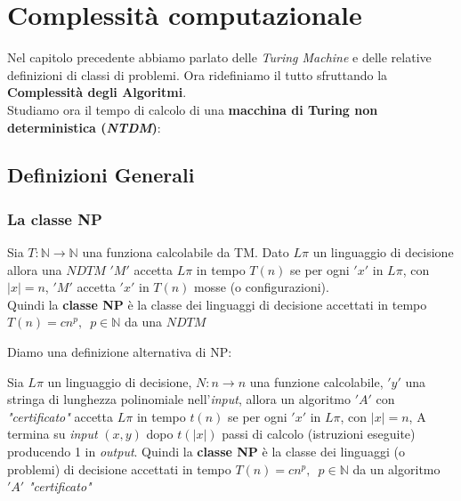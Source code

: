 \chapter{Complessità computazionale}
Nel capitolo precedente abbiamo parlato delle \textit{Turing Machine} e delle relative definizioni di classi di problemi. Ora ridefiniamo il tutto sfruttando la \textbf{Complessità degli Algoritmi}.\\
Studiamo ora il tempo di calcolo di una \textbf{macchina di Turing non
	deterministica (\textit{NTDM})}:
\section{Definizioni Generali}
\subsection{La classe NP}
\begin{definizione}
	Sia $T:\mathbb{N}\to\mathbb{N}$ una funziona calcolabile da TM. Dato $L\pi$ un
	linguaggio di decisione allora una $NDTM$ $ 'M' $ accetta $L\pi$ in tempo
	$T(n)$ se per ogni $ 'x' $ in $L\pi$, con $|x|=n$,  $ 'M' $ accetta $ 'x' $ in $T(n)$
	mosse (o configurazioni).\\
	Quindi la \textbf{classe NP} è la classe dei linguaggi di decisione accettati
	in tempo $T(n)=cn^p,\,\,\,p\in \mathbb{N}$ da una $NDTM$
\end{definizione}
Diamo una definizione alternativa di NP:
\begin{definizione}
	Sia $L\pi$ un linguaggio di decisione, $N:n\to n$ una funzione calcolabile,
	$ 'y' $ una stringa di lunghezza polinomiale nell'\textit{input}, allora un algoritmo $ 'A' $
	con \textit{"certificato"} accetta $L\pi$ in tempo $t(n)$ se per ogni $ 'x' $ in $L\pi$,
	con $|x|=n$, A termina su \textit{input} $(x,y)$ dopo $t(|x|)$ passi di calcolo
	(istruzioni eseguite) producendo 1 in \textit{output}.
	Quindi la \textbf{classe NP} è la classe dei linguaggi (o problemi) di
	decisione accettati in tempo $T(n)=cn^p,\,\,\,p\in\mathbb{N}$ da un algoritmo
	$ 'A' $ \textit{"certificato"}
\end{definizione}
